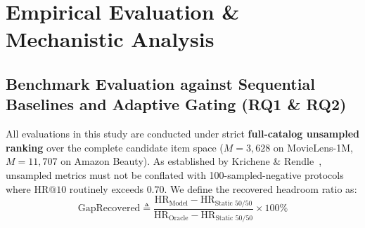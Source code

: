 
\section{Empirical Evaluation \& Mechanistic Analysis}
\label{sec:empirical}

\subsection{Benchmark Evaluation against Sequential Baselines and Adaptive Gating (RQ1 \& RQ2)}
\label{sec:benchmark}

All evaluations in this study are conducted under strict \textbf{full-catalog unsampled ranking} over the complete candidate item space ($M=3{,}628$ on MovieLens-1M, $M=11{,}707$ on Amazon Beauty). As established by Krichene \& Rendle~\cite{krichene2020sampled}, unsampled metrics must not be conflated with 100-sampled-negative protocols where $\text{HR@10}$ routinely exceeds $0.70$.
We define the recovered headroom ratio as:
\begin{equation}
    \text{GapRecovered} \triangleq \frac{\text{HR}_{\text{Model}} - \text{HR}_{\text{Static 50/50}}}{\text{HR}_{\text{Oracle}} - \text{HR}_{\text{Static 50/50}}} \times 100\%
\end{equation}

